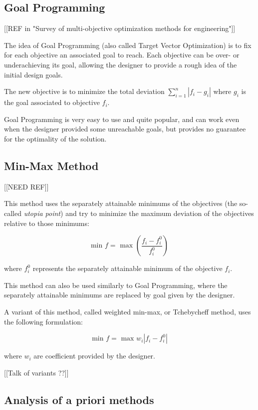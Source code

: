 \subsection{Goal Programming}

[[REF in "Survey of multi-objective optimization methods for engineering"]]

The idea of Goal Programming (also called Target Vector Optimization) is to fix for each objective an associated goal to reach. Each objective can be over- or underachieving its goal, allowing the designer to provide a rough idea of the initial design goals.

The new objective is to minimize the total deviation $\sum_{i=1}^n |f_i - g_i|$ where $g_i$ is the goal associated to objective $f_i$.

Goal Programming is very easy to use and quite popular, and can work even when the designer provided some unreachable goals, but provides no guarantee for the optimality of the solution.

\subsection{Min-Max Method}

[[NEED REF]]

This method uses the separately attainable minimums of the objectives (the so-called \emph{utopia point}) and try to minimize the maximum deviation of the objectives relative to those minimums:

\[ \text{min } f = \text{ max } \left( \frac{f_i - f_i^0}{f_i^0} \right) \]

where $f_i^0$ represents the separately attainable minimum of the objective $f_i$.

This method can also be used similarly to Goal Programming, where the separately attainable minimums are replaced by goal given by the designer.

A variant of this method, called weighted min-max, or Tchebycheff method, uses the following formulation:

\[ \text{min } f = \text{ max } w_i |f_i - f_i^0| \]

where $w_i$ are coefficient provided by the designer.

[[Talk of variants ??]]

\subsection{Analysis of a priori methods}

